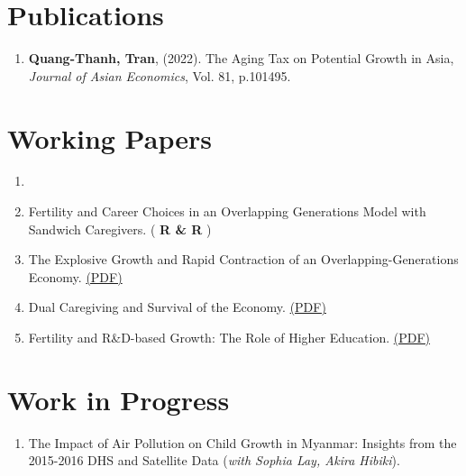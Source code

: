 \section{\sc Publications}
\begin{enumerate}
\item
  {\bf Quang-Thanh, Tran},
  (2022).
  {The Aging Tax on Potential Growth in Asia},
  {\it Journal of Asian Economics}, Vol. 81, p.101495.
\end{enumerate}

\section{\sc Working Papers}
\begin{enumerate}
  \item \item Fertility and Career Choices in an Overlapping Generations Model with Sandwich Caregivers. (\textbf{ R \& R })
  \item The Explosive Growth and Rapid Contraction of an Overlapping-Generations Economy. \href{https://www.dropbox.com/scl/fi/a7b1vnmypehibjmd2wim4/main_rapidcontraction.pdf?rlkey=t3aoep2iiy7shjmpq9cp6tuz3&st=b5jwqdqg&dl=0}{(PDF)}
  \item Dual Caregiving and Survival of the Economy. \href{https://www.dropbox.com/scl/fi/s00pcg0017vtyeb364hlc/main_dualcare-copy.pdf?rlkey=koecpcdaoeroijigjm5x4dtzv&st=6rnfdie5&dl=0}{(PDF)}
  \item Fertility and R\&D-based Growth: The Role of Higher Education. \href{https://www.dropbox.com/scl/fi/6bkvc2vxrbst1iwocxwdl/main_overedu.pdf?rlkey=v59fcybxfcd105y2ciassjttn&st=ym5ntxq0&dl=0}{(PDF)}
\end{enumerate}

\section{\sc Work in Progress}
\begin{enumerate}
  \item The Impact of Air Pollution on Child Growth in Myanmar: Insights from the 2015-2016 DHS and Satellite Data (\textit{with Sophia Lay, Akira Hibiki}).
\end{enumerate}


